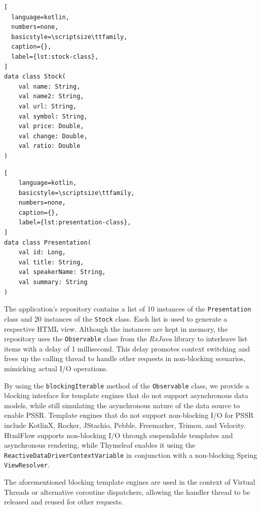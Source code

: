 \documentclass[software,article,accept,pdftex,moreauthors]{Definitions/mdpi}
\begin{document}
\begin{listing}[H]
\caption{\texttt{\hl{Stock}} class.}
            \begin{lstlisting}[
  language=kotlin,
  numbers=none,
  basicstyle=\scriptsize\ttfamily,
  caption={},
  label={lst:stock-class},
]
data class Stock(
    val name: String,
    val name2: String,
    val url: String,
    val symbol: String,
    val price: Double, 
    val change: Double, 
    val ratio: Double
)
\end{lstlisting}
\end{listing}

\begin{listing}[H]
\caption{\texttt{\hl{Presentation}} class.}
            \begin{lstlisting}[
    language=kotlin,
    basicstyle=\scriptsize\ttfamily,
    numbers=none,
    caption={},
    label={lst:presentation-class},
]
data class Presentation(
    val id: Long,
    val title: String, 
    val speakerName: String,
    val summary: String
)
\end{lstlisting}
\end{listing}

The application's repository contains a list of 10 instances of the
\texttt{Presentation} class and 20 instances of the \texttt{Stock} class. Each
list is used to generate a respective HTML view. Although the instances are
kept in memory, the repository uses the \texttt{Observable} class from the
\textit{RxJava} library to interleave list items with a delay of 1 millisecond.
This delay promotes context switching and frees up the calling thread to handle
other requests in non-blocking scenarios, mimicking actual I/O operations.

By using the \texttt{blockingIterable} method of the \texttt{Observable} class,
we provide a blocking interface for template engines that do not support
asynchronous data models, while still simulating the asynchronous nature of the
data source to enable PSSR\@. Template engines that do not support non-blocking
I/O for PSSR include KotlinX, Rocker, JStachio, Pebble, Freemarker, Trimou, and
Velocity. HtmlFlow supports non-blocking I/O through suspendable templates and
asynchronous rendering, while Thymeleaf enables it using the
\texttt{ReactiveDataDriverContextVariable} in conjunction with a non-blocking
Spring \texttt{ViewResolver}.

The aforementioned blocking template engines are used in the context of Virtual
Threads or alternative coroutine dispatchers, allowing the handler thread to be
released and reused for other requests.
\end{document}
